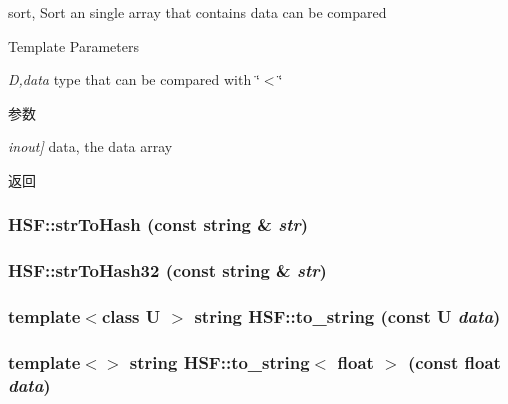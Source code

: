 sort, Sort an single array that contains data can be compared 
\begin{DoxyTemplParams}{Template Parameters}
\item[{\em D,data}]type that can be compared with \char`\"{}$<$\char`\"{} \end{DoxyTemplParams}

\begin{DoxyParams}{参数}
\item[{\em inout\mbox{]}}]data, the data array \end{DoxyParams}
\begin{DoxyReturn}{返回}

\end{DoxyReturn}
\hypertarget{namespaceHSF_aedfe7e5a36d177f98a898f484caa0632}{
\subsubsection[{strToHash}]{ HSF::strToHash (const string \& {\em str})}}
\label{namespaceHSF_aedfe7e5a36d177f98a898f484caa0632}
\hypertarget{namespaceHSF_ad68464331a75b6716258b105a8076144}{
\subsubsection[{strToHash32}]{ HSF::strToHash32 (const string \& {\em str})}}
\label{namespaceHSF_ad68464331a75b6716258b105a8076144}
\hypertarget{namespaceHSF_ac32a245cfeb03fd2cc3976cef2171da1}{
\subsubsection[{to\_\-string}]{\setlength{\rightskip}{0pt plus 5cm}template$<$class U $>$ string HSF::to\_\-string (const U {\em data})}}
\label{namespaceHSF_ac32a245cfeb03fd2cc3976cef2171da1}
\hypertarget{namespaceHSF_abc82617f6255755f345594061a46c88b}{
\subsubsection[{to\_\-string$<$ float $>$}]{\setlength{\rightskip}{0pt plus 5cm}template$<$$>$ string HSF::to\_\-string$<$ float $>$ (const float {\em data})}}

